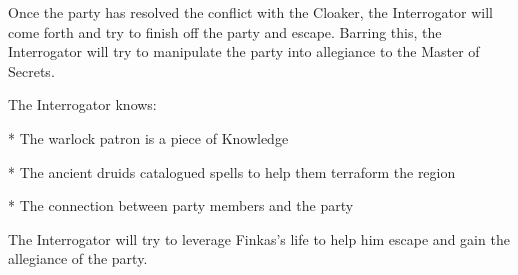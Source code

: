 Once the party has resolved the conflict with the Cloaker, the Interrogator will come forth and try to finish off the party and escape.
Barring this, the Interrogator will try to manipulate the party into allegiance to the Master of Secrets.

The Interrogator knows:

* The warlock patron is a piece of Knowledge

* The ancient druids catalogued spells to help them terraform the region

* The connection between party members and the party

The Interrogator will try to leverage Finkas's life to help him escape and gain the allegiance of the party.

